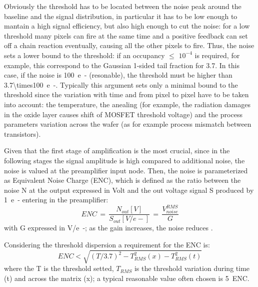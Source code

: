         Obviously the threshold has to be located between the noise peak around the baseline and the signal distribution, in particular it has to be low enough to mantain a high signal efficiency, but also high enough to cut the noise: for a low threshold many pixels can fire at the same time and a positive feedback can set off a chain reaction eventually, causing all the other pixels to fire.
        Thus, the noise sets a lower bound to the threshold: if an occupancy $\leqslant$ $10^{-4}$ is required, for example, this correspond to the Gaussian 1-sided tail fraction for \SI{3.7}{\sigma}.
        In this case, if the noise is \SI{100}{e-} (resonable), the threshold must be higher than \SI[parse-numbers=false]{3.7\times100}{e-}.
        Typically this argument sets only a minimal bound to the threshold since the variation with time and from pixel to pixel have to be taken into account: the temperature, the anealing (for example, the radiation damages in the oxide layer causes shift of MOSFET threshold voltage) and the process parameters variation across the wafer (as for example process mismatch between transistors). 
        
        Given that the first stage of amplification is the most crucial, since in the following stages the signal amplitude is high compared to additional noise, the noise is valued at the preamplifier input node.
        Then, the noise is parameterized as Equivalent Noise Charge (ENC), which is defined as the ratio between the noise N at the output expressed in Volt and the out voltage signal S produced by \SI{1}{e-} entering in the preamplifier:
        \begin{equation}
            ENC\, =\, \frac{N_{out}[V]}{S_{out}[V/e-]}\,=\,\frac{V^{RMS} _{noise}}{G}
        \end{equation} 
        with G expressed in \si{V/e-}; as the gain increases, the noise reduces . 

        Considering the threshold dispersion a requirement for the ENC is: 
        \begin{equation}
            ENC < \sqrt{(T/3.7)^2 - T_{RMS} ^2 (x) - T_{RMS} ^2 (t)}
        \end{equation}
        where the T is the threshold setted, $T_{RMS}$ is the threshold variation during time (t) and across the matrix (x); a typical reasonable value often chosen is \SI{5}{ENC}.

